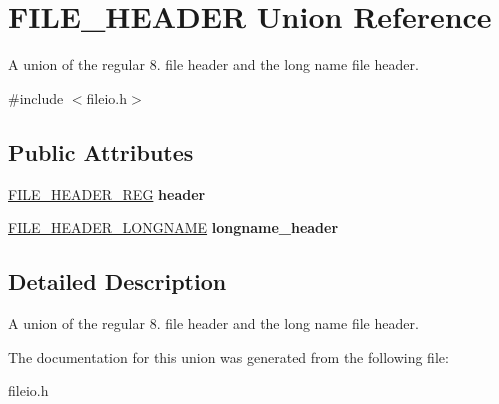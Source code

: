 \hypertarget{union_f_i_l_e___h_e_a_d_e_r}{}\section{F\+I\+L\+E\+\_\+\+H\+E\+A\+D\+E\+R Union Reference}
\label{union_f_i_l_e___h_e_a_d_e_r}


A union of the regular 8. file header and the long name file header.  




{\ttfamily \#include $<$fileio.\+h$>$}

\subsection*{Public Attributes}
\begin{DoxyCompactItemize}
\item 
\hypertarget{union_f_i_l_e___h_e_a_d_e_r_a564b6fd667f1bc5d765f29e105d37046}{}\hyperlink{struct_f_i_l_e___h_e_a_d_e_r___r_e_g}{F\+I\+L\+E\+\_\+\+H\+E\+A\+D\+E\+R\+\_\+\+R\+E\+G} {\bfseries header}\label{union_f_i_l_e___h_e_a_d_e_r_a564b6fd667f1bc5d765f29e105d37046}

\item 
\hypertarget{union_f_i_l_e___h_e_a_d_e_r_a50d5ee3ed09bd3a5fe768cb450e0b4b4}{}\hyperlink{struct_f_i_l_e___h_e_a_d_e_r___l_o_n_g_n_a_m_e}{F\+I\+L\+E\+\_\+\+H\+E\+A\+D\+E\+R\+\_\+\+L\+O\+N\+G\+N\+A\+M\+E} {\bfseries longname\+\_\+header}\label{union_f_i_l_e___h_e_a_d_e_r_a50d5ee3ed09bd3a5fe768cb450e0b4b4}

\end{DoxyCompactItemize}


\subsection{Detailed Description}
A union of the regular 8. file header and the long name file header. 

The documentation for this union was generated from the following file\+:\begin{DoxyCompactItemize}
\item 
fileio.\+h\end{DoxyCompactItemize}
